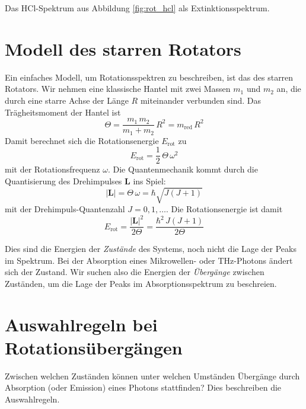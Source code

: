 \begin{marginfigure}
\caption{Das HCl-Spektrum aus Abbildung \ref{fig:rot_hcl} als Extinktionsspektrum.}
\end{marginfigure}


\section{Modell des starren Rotators}

Ein einfaches Modell, um Rotationsspektren zu beschreiben, ist das des starren Rotators. Wir nehmen eine klassische Hantel mit zwei Massen $m_1$ und $m_2$ an, die durch eine starre Achse der Länge $R$ miteinander verbunden sind. Das Trägheitsmoment der Hantel ist
\begin{equation}
 \Theta = \frac{m_1 \, m_2}{m_1 + m_2} \, R^2 = m_\text{red} \, R^2
\end{equation}
Damit berechnet sich die Rotationsenergie $E_\text{rot}$ zu
\begin{equation}
 E_\text{rot} = \frac{1}{2} \, \Theta \, \omega^2
\end{equation}
mit der Rotationsfrequenz $\omega$. Die Quantenmechanik kommt durch die Quantisierung des Drehimpulses $\mathbf{L} $ ins Spiel:
\begin{equation}
 | \mathbf{L} | = \Theta \, \omega = \hbar \sqrt{J (J + 1)}
\end{equation}
mit der Drehimpuls-Quantenzahl $J = 0, 1, \dots$. Die Rotationsenergie ist damit
\begin{equation}
 E_\text{rot} = \frac{ | \mathbf{L} |^2}{2 \Theta} = \frac{\hbar^2 \, J (J+1)}{2 \Theta}
\end{equation}

Dies sind die Energien der \emph{Zustände} des Systems, noch nicht die Lage der Peaks im Spektrum. Bei der Absorption eines Mikrowellen- oder THz-Photons ändert sich der Zustand. Wir suchen also die Energien der \emph{Übergänge} zwischen Zuständen, um die Lage der Peaks im Absorptionsspektrum zu beschreien.

\section{Auswahlregeln bei Rotationsübergängen}

Zwischen welchen Zuständen können unter welchen Umständen Übergänge durch Absorption (oder Emission) eines Photons stattfinden? Dies beschreiben  die Auswahlregeln.

